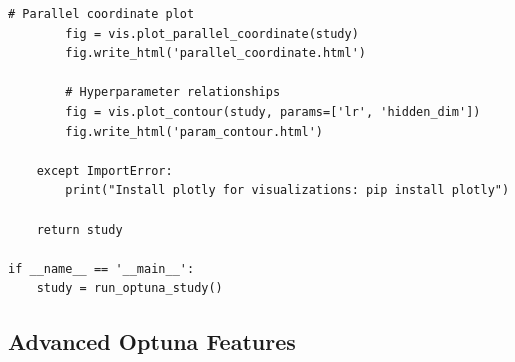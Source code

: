 \begin{lstlisting}[style=python, caption=Advanced Optuna hyperparameter optimization]
        # Parallel coordinate plot
        fig = vis.plot_parallel_coordinate(study)
        fig.write_html('parallel_coordinate.html')

        # Hyperparameter relationships
        fig = vis.plot_contour(study, params=['lr', 'hidden_dim'])
        fig.write_html('param_contour.html')

    except ImportError:
        print("Install plotly for visualizations: pip install plotly")

    return study

if __name__ == '__main__':
    study = run_optuna_study()
\end{lstlisting}

\subsection{Advanced Optuna Features}


